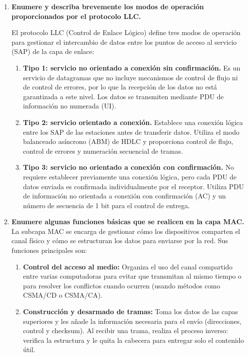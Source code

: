 \documentclass[11pt,a4paper]{article}
\begin{document}
\begin{enumerate}[label=15.\arabic*), itemsep=0.3cm]
  \item
  \textbf{Enumere y describa brevemente los modos de operación proporcionados por el protocolo LLC.}

        El protocolo LLC (Control de Enlace Lógico) define tres modos de operación para gestionar el intercambio de datos entre los puntos de acceso al servicio (SAP) de la capa de enlace:

        \begin{enumerate}[label=\arabic*., itemsep=0.2cm]
          \item \textbf{Tipo 1: servicio no orientado a conexión sin confirmación.} Es un servicio de datagramas que no incluye mecanismos de control de flujo ni de control de errores, por lo que la recepción de los datos no está garantizada a este nivel. Los datos se transmiten mediante PDU de información no numerada (UI).

          \item \textbf{Tipo 2: servicio orientado a conexión.} Establece una conexión lógica entre los SAP de las estaciones antes de transferir datos. Utiliza el modo balanceado asíncrono (ABM) de HDLC y proporciona control de flujo, control de errores y numeración secuencial de tramas.

          \item \textbf{Tipo 3: servicio no orientado a conexión con confirmación.} No requiere establecer previamente una conexión lógica, pero cada PDU de datos enviada es confirmada individualmente por el receptor. Utiliza PDU de información no orientada a conexión con confirmación (AC) y un número de secuencia de 1 bit para el control de entrega.
        \end{enumerate}
        
  \item \textbf{Enumere algunas funciones básicas que se realicen en la capa MAC.}
    La subcapa MAC se encarga de gestionar cómo los dispositivos comparten el canal físico y cómo se estructuran los datos para enviarse por la red. Sus funciones principales son:

    \begin{enumerate}
        \item \textbf{Control del acceso al medio:}
        Organiza el uso del canal compartido entre varias computadoras para evitar que transmitan al mismo tiempo o para resolver los conflictos cuando ocurren (usando métodos como CSMA/CD o CSMA/CA).

        \item \textbf{Construcción y desarmado de tramas:}
        Toma los datos de las capas superiores y les añade la información necesaria para el envío (direcciones, control y checksum). Al recibir una trama, realiza el proceso inverso: verifica la estructura y le quita la cabecera para entregar solo el contenido útil.


\end{enumerate}
\end{enumerate}
\end{document}
